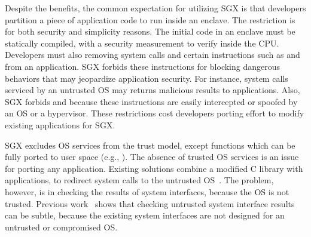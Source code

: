 Despite the benefits,
the common expectation for utilizing SGX is
that developers partition a piece of application code to run inside an enclave.
The restriction is for both security and simplicity reasons.
The initial code in an enclave must be
statically compiled,
with a security measurement to verify inside the CPU.
Developers must also removing system calls and
certain instructions such as  and  from an application.
SGX forbids these instructions
for blocking
dangerous behaviors that may jeopardize application security.
For instance,
system calls serviced by an untrusted OS
may returns malicious results
to applications.
Also, SGX forbids  and  because these instructions are easily intercepted or spoofed by an OS
or a hypervisor.
These restrictions cost developers porting effort to modify existing applications for SGX.



SGX excludes OS services from the trust model, except functions which can be fully ported to user space (e.g., ).
The absence of trusted OS services is an issue for porting any application.
Existing solutions combine a modified C library with applications, to redirect system calls
to the untrusted OS~\cite{osdi16scone,shinde17panoply}.
The problem, however, is in checking the results of system interfaces, because the OS is not trusted. %
Previous work~\cite{checkoway13iago} shows that
checking untrusted system interface results can be subtle, because the existing system interfaces are not designed for an untrusted or compromised OS.



